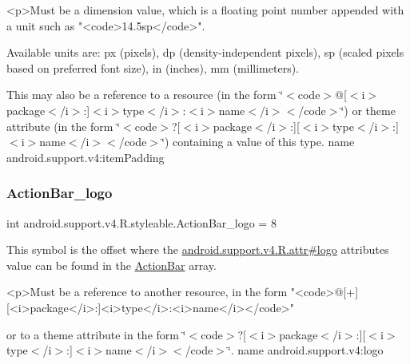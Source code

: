 \begin{DoxyVerb}      <p>Must be a dimension value, which is a floating point number appended with a unit such as "<code>14.5sp</code>".
\end{DoxyVerb}
 Available units are\+: px (pixels), dp (density-\/independent pixels), sp (scaled pixels based on preferred font size), in (inches), mm (millimeters). 

This may also be a reference to a resource (in the form \char`\"{}$<$code$>$@\mbox{[}$<$i$>$package$<$/i$>$\+:\mbox{]}$<$i$>$type$<$/i$>$\+:$<$i$>$name$<$/i$>$$<$/code$>$\char`\"{}) or theme attribute (in the form \char`\"{}$<$code$>$?\mbox{[}$<$i$>$package$<$/i$>$\+:\mbox{]}\mbox{[}$<$i$>$type$<$/i$>$\+:\mbox{]}$<$i$>$name$<$/i$>$$<$/code$>$\char`\"{}) containing a value of this type.  name android.\+support.\+v4\+:item\+Padding \mbox{\label{classandroid_1_1support_1_1v4_1_1R_1_1styleable_aaa9284e4203b58e1c1be7d41138d3b94}} 
\subsubsection{\texorpdfstring{Action\+Bar\+\_\+logo}{ActionBar\_logo}}
{\footnotesize\ttfamily int android.\+support.\+v4.\+R.\+styleable.\+Action\+Bar\+\_\+logo = 8\hspace{0.3cm}{\ttfamily [static]}}

This symbol is the offset where the \hyperlink{classandroid_1_1support_1_1v4_1_1R_1_1attr_a5b5fc6d210aa9218c697c43ca20f6fdf}{android.\+support.\+v4.\+R.\+attr\#logo} attribute\textquotesingle{}s value can be found in the \hyperlink{classandroid_1_1support_1_1v4_1_1R_1_1styleable_adc5a3492b9c46265760d7120a04d6afa}{Action\+Bar} array.

\begin{DoxyVerb}      <p>Must be a reference to another resource, in the form "<code>@[+][<i>package</i>:]<i>type</i>:<i>name</i></code>"
\end{DoxyVerb}
 or to a theme attribute in the form \char`\"{}$<$code$>$?\mbox{[}$<$i$>$package$<$/i$>$\+:\mbox{]}\mbox{[}$<$i$>$type$<$/i$>$\+:\mbox{]}$<$i$>$name$<$/i$>$$<$/code$>$\char`\"{}.  name android.\+support.\+v4\+:logo \mbox{\label{classandroid_1_1support_1_1v4_1_1R_1_1styleable_a0f55fffd685c46c93b83a67738984c79}} 
